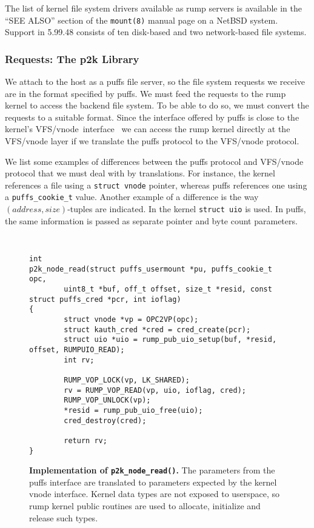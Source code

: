 The list of kernel file system drivers available as rump servers
is available in the ``SEE ALSO'' section of the \texttt{mount(8)}
manual page on a NetBSD system.  Support in 5.99.48 consists of ten
disk-based and two network-based file systems.

\subsubsection{Requests: The p2k Library}

We attach to the host as a puffs file server, so the file system
requests we receive are in the format specified by puffs.  We must
feed the requests to the rump kernel to access the backend file
system.  To be able to do so, we must convert the requests to a
suitable format.  Since the interface offered by puffs is close to
the kernel's VFS/vnode~interface~\cite{daemonbook} we can access
the rump kernel directly at the VFS/vnode layer if we translate
the puffs protocol to the VFS/vnode protocol.

We list some examples of differences between the puffs protocol
and VFS/vnode protocol that we must deal with by translations.
For instance, the kernel references a file using a \texttt{struct
vnode} pointer, whereas puffs references one using a
\texttt{puffs\_cookie\_t} value.  Another example of a difference
is the way $(address,size)$-tuples are indicated.  In the kernel
\texttt{struct uio} is used.  In puffs, the same information is
passed as separate pointer and byte count parameters.

\begin{figure}[t]
{\tt \scriptsize
\begin{verbatim}
int
p2k_node_read(struct puffs_usermount *pu, puffs_cookie_t opc,
        uint8_t *buf, off_t offset, size_t *resid, const struct puffs_cred *pcr, int ioflag)
{
        struct vnode *vp = OPC2VP(opc);
        struct kauth_cred *cred = cred_create(pcr);
        struct uio *uio = rump_pub_uio_setup(buf, *resid, offset, RUMPUIO_READ);
        int rv;

        RUMP_VOP_LOCK(vp, LK_SHARED);
        rv = RUMP_VOP_READ(vp, uio, ioflag, cred);
        RUMP_VOP_UNLOCK(vp);
        *resid = rump_pub_uio_free(uio);
        cred_destroy(cred);

        return rv;
}
\end{verbatim}}
\caption[Implementation of \texttt{p2k\_node\_read()}]{
\textbf{Implementation of \texttt{p2k\_node\_read()}.}
The parameters from the puffs interface are translated to parameters
expected by the kernel vnode interface.  Kernel data types are not exposed
to userspace, so rump kernel public routines are used to allocate,
initialize and release such types.
}
\label{fig:p2kread}
\end{figure}

